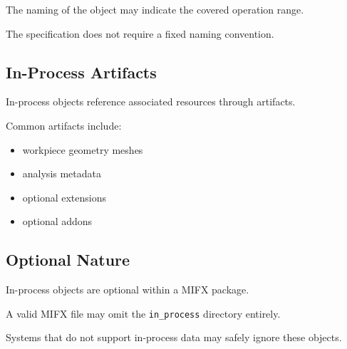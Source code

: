 The naming of the object may indicate the covered operation range.

The specification does not require a fixed naming convention.

\subsection{In-Process Artifacts}

In-process objects reference associated resources through artifacts.

Common artifacts include:

\begin{itemize}
\item workpiece geometry meshes
\item analysis metadata
\item optional extensions
\item optional addons
\end{itemize}

\subsection{Optional Nature}

In-process objects are optional within a MIFX package.

A valid MIFX file may omit the \texttt{in\_process} directory entirely.

Systems that do not support in-process data may safely ignore these objects.

